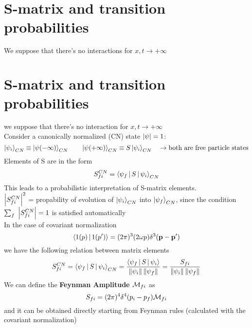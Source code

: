 \section{S-matrix and transition probabilities}
We suppose that there's no interactions for $x, t \to +\infty$

\section{S-matrix and transition probabilities}
we suppose that there's no interaction for $x, t \to +\infty$\\
Consider a canonically normalized (CN) state $\abs{\psi} = 1$:
\[
\Ket{\psi_i}_{CN} \equiv \Ket{\psi(-\infty)}_{CN}
\qquad
\Ket{\psi(+\infty)}_{CN} \equiv S \Ket{\psi_i}_{CN}
\quad \to \textup{both are free particle states}
\]
Elements of S are in the form
\[
S_{fi}^{CN} = \Braket{\psi_f | S | \psi_i}_{CN}
\]
This leads to a probabilistic interpretation of S-matrix elements.\\
$\abs{S_{fi}^{CN}}^2$ = propability of evolution of $\Ket{\psi_i}_{CN}$ into $\Ket{\psi_f}_{CN}$, since the condition $\sum_f \ \abs{S_{fi}^{CN}} = 1$ is satisfied automatically\\
In the case of covariant normalization
\[
\Braket{1(p) | 1(p')} = (2 \pi)^3 (2 \omega p)\delta^3 (\vec{p} - \vec{p}')
\]
we have the following relation between matrix elements
\[
S_{fi}^{CN} = \Braket{\psi_f | S |\psi_i}_{CN} = \frac{\Braket{\psi_f | S | \psi_i}}{\norma{\psi_i} \norma{\psi_f}} = \frac{S_{fi}}{\norma{\psi_i} \norma{\psi_f}}
\]
We can define the \textbf{Feynman Amplitude $\mathM_{fi}$} as
\[
S_{fi} = (2 \pi)^4 \delta^4 (p_i - p_f) \mathM_{fi}
\]
and it can be obtained directly starting from Feynman rules (calculated with the covariant normalization)

